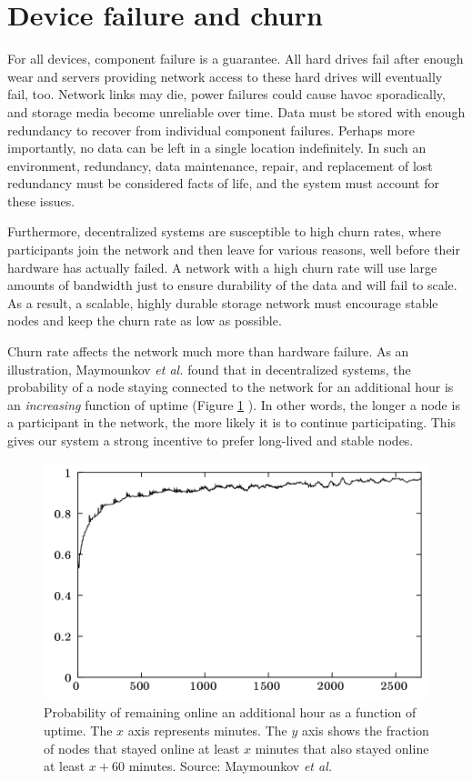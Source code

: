 \documentclass[11pt,fleqn,openany]{book}
\begin{document}
\section{Device failure and churn}

For all devices, component failure is a guarantee.
All hard drives fail after enough wear
\cite{backblaze-hd-2018-q1} and servers providing network access to
these hard drives will eventually fail, too. Network links may die, power
failures could cause havoc sporadically,
and storage media become unreliable over time.
Data must be stored with enough redundancy to recover from
individual component failures.
Perhaps more importantly, no data can be left in a single location
indefinitely. In such an environment, redundancy, data
maintenance, repair, and replacement of lost redundancy must be considered
facts of life, and the system must account for these issues.

Furthermore, decentralized systems are susceptible to high churn rates, where
participants join the network and then leave for various reasons, well
before their hardware has actually failed. A network with a high churn rate will
use large amounts of bandwidth just to ensure durability of the data and
will fail to scale. As a result, a scalable, highly durable storage
network must encourage stable nodes and keep the churn rate as low as possible.

Churn rate affects the network much more than hardware failure. As an
illustration, Maymounkov {\em et al.} found that in
decentralized systems, the probability of a node staying connected to the
network for an additional hour is an {\em increasing}
function of uptime (Figure \ref{fig:kad-uptime} \cite{kad}).
In other words, the longer a node is a
participant in the network, the more likely it is to continue
participating. This gives our system a strong incentive to prefer long-lived
and stable nodes.

\begin{figure}
\centering
\includegraphics[width=.6\textwidth]{images/uptime.png}
\caption{Probability of remaining online an additional hour as a function of
uptime.
The $x$ axis represents minutes. The $y$ axis shows the fraction of nodes
that stayed online at least $x$ minutes that also stayed online at least
$x+60$ minutes. Source: Maymounkov {\em et al.} \cite{kad}}
\label{fig:kad-uptime}
\end{figure}
\end{document}
